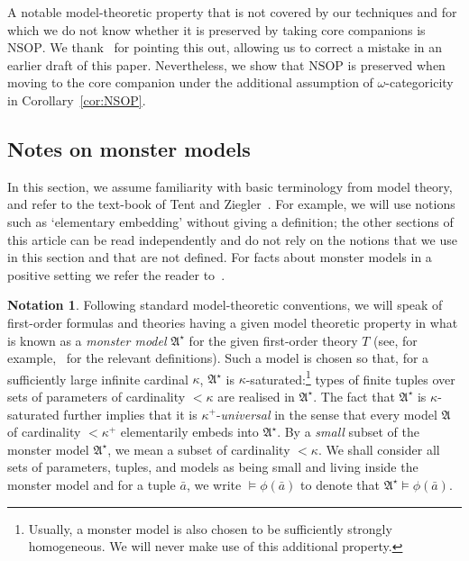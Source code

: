 \documentclass{amsart}
\theoremstyle{definition}
\newtheorem{notation}[theorem]{Notation}
\theoremstyle{remark}
\numberwithin{equation}{section}
\newcommand{\fa}{\mathfrak{A}}
\begin{document}
    A notable model-theoretic property that is not covered by our techniques and for which we do not know whether it is preserved by taking core companions is $\mathrm{NSOP}$.
We thank~\cite{day2026notion} for pointing this out, allowing us to correct a mistake in an earlier draft of this paper. Nevertheless, we show that $\mathrm{NSOP}$ is preserved when moving to the core companion under the additional assumption of $\omega$-categoricity in Corollary~\ref{cor:NSOP}.



\subsection{{Notes} on monster models}
	In this section, we assume familiarity with basic terminology from model theory, and refer to the text-book of Tent and Ziegler~\cite{Tent-Ziegler}. For example, we will use notions such as `elementary embedding' without giving a definition; the other sections of this article can be read independently and do not rely on the notions that we use in this section and that are not defined. For facts about monster models in a positive setting we refer the reader to~\cite{kamsma2025positivelogicintroductionmodel}.
\begin{notation}\label{not_monster} Following standard model-theoretic conventions, we will speak of first-order formulas and theories having a given model theoretic property in what is known as a \textit{monster model} $\fa^\star$ for the given first-order theory $T$ (see, for example,~\cite[$\S$ 6.1]{Tent-Ziegler} for the relevant definitions). Such a model is chosen so that, for a sufficiently large infinite cardinal $\kappa$, $\fa^\star$ is $\kappa$-saturated:\footnote{Usually, a monster model is also chosen to be sufficiently strongly homogeneous. We will never make use of this additional property.} types of finite tuples over sets of parameters of cardinality $<\kappa$ are realised in $\fa^\star$. The fact that $\fa^\star$ is $\kappa$-saturated further implies that  it is $\kappa^+$-\textit{universal} in the sense that every model $\fa$ of cardinality $<\kappa^+$ elementarily embeds into $\fa^\star$. By a \textit{small} subset of the monster model $\fa^\star$, we mean a subset of cardinality $<\kappa$. We shall consider all sets of parameters, tuples, and models as being small and living inside the monster model and for a tuple $\bar{a}$, we write $\vDash \phi(\bar{a})$ to denote that $\fa^\star\vDash \phi(\bar{a})$.
\end{notation}
\end{document}
